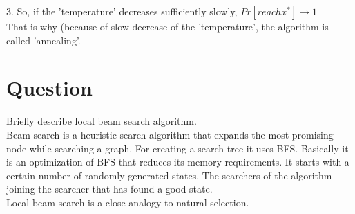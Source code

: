 \documentclass[paper=a4, fontsize=11pt]{scrartcl} %
\begin{document}
3. So, if the 'temperature' decreases sufficiently slowly, $Pr[reach x^*] \rightarrow 1$\\

That is why (because of slow decrease of the 'temperature', the algorithm is called 'annealing'.


\section{Question}

Briefly describe local beam search algorithm.\\


Beam search is a heuristic search algorithm that expands the most promising node while searching a graph. For creating a search tree it uses BFS. Basically it is an optimization of BFS that reduces its memory requirements.  It starts with a certain number of randomly generated states. The searchers of the algorithm joining the searcher that has found a good state.\\

Local beam search is a close analogy to natural selection.
\end{document}
